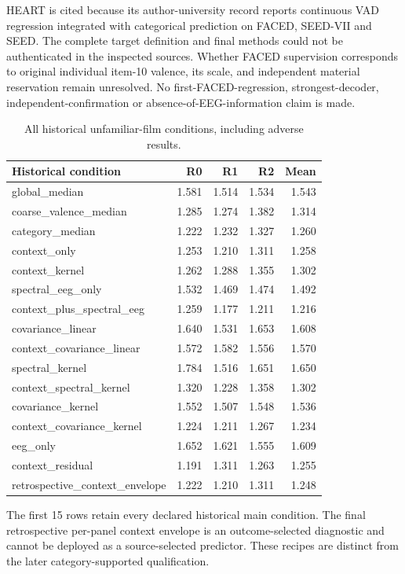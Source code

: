 \documentclass[10pt,a4paper]{article}
\begin{document}
HEART is cited because its author-university record reports continuous VAD regression integrated with categorical prediction on FACED, SEED-VII and SEED. The complete target definition and final methods could not be authenticated in the inspected sources. Whether FACED supervision corresponds to original individual item-10 valence, its scale, and independent material reservation remain unresolved. No first-FACED-regression, strongest-decoder, independent-confirmation or absence-of-EEG-information claim is made.

\clearpage
\begin{table}[tbp]
\centering
\small
\caption{All historical unfamiliar-film conditions, including adverse results.}
\label{tab:allconditions}
\begin{tabular}{lrrrr}
\toprule
Historical condition & R0 & R1 & R2 & Mean \\
\midrule
global\_median & 1.581 & 1.514 & 1.534 & 1.543 \\
coarse\_valence\_median & 1.285 & 1.274 & 1.382 & 1.314 \\
category\_median & 1.222 & 1.232 & 1.327 & 1.260 \\
context\_only & 1.253 & 1.210 & 1.311 & 1.258 \\
context\_kernel & 1.262 & 1.288 & 1.355 & 1.302 \\
spectral\_eeg\_only & 1.532 & 1.469 & 1.474 & 1.492 \\
context\_plus\_spectral\_eeg & 1.259 & 1.177 & 1.211 & 1.216 \\
covariance\_linear & 1.640 & 1.531 & 1.653 & 1.608 \\
context\_covariance\_linear & 1.572 & 1.582 & 1.556 & 1.570 \\
spectral\_kernel & 1.784 & 1.516 & 1.651 & 1.650 \\
context\_spectral\_kernel & 1.320 & 1.228 & 1.358 & 1.302 \\
covariance\_kernel & 1.552 & 1.507 & 1.548 & 1.536 \\
context\_covariance\_kernel & 1.224 & 1.211 & 1.267 & 1.234 \\
eeg\_only & 1.652 & 1.621 & 1.555 & 1.609 \\
context\_residual & 1.191 & 1.311 & 1.263 & 1.255 \\
retrospective\_context\_envelope & 1.222 & 1.210 & 1.311 & 1.248 \\
\bottomrule
\end{tabular}
\par\medskip\begin{minipage}{0.97\linewidth}\footnotesize The first 15 rows retain every declared historical main condition. The final retrospective per-panel context envelope is an outcome-selected diagnostic and cannot be deployed as a source-selected predictor. These recipes are distinct from the later category-supported qualification.\end{minipage}
\end{table}
\end{document}
